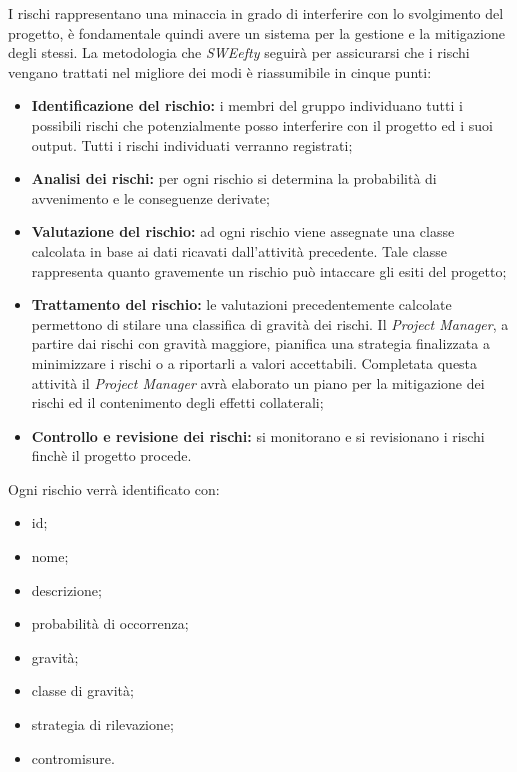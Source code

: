 I rischi rappresentano una minaccia in grado di interferire con lo svolgimento del progetto, è fondamentale quindi avere un sistema per la gestione e la mitigazione degli stessi.
La metodologia che \textit{SWEefty} seguirà per assicurarsi che i rischi vengano trattati nel migliore dei modi è riassumibile in cinque punti:
\begin{itemize}
	\item \textbf{Identificazione del rischio:} i membri del gruppo individuano tutti i possibili rischi che potenzialmente posso interferire con il progetto ed i suoi output. Tutti i rischi individuati verranno registrati;
	
	\item \textbf{Analisi dei rischi:} per ogni rischio si determina la probabilità di avvenimento e le conseguenze derivate;
	
	\item \textbf{Valutazione del rischio:} ad ogni rischio viene assegnate una classe calcolata in base ai dati ricavati dall'attività precedente. Tale classe rappresenta quanto gravemente un rischio può intaccare gli esiti del progetto;
	
	\item \textbf{Trattamento del rischio:} le valutazioni precedentemente calcolate permettono di stilare una classifica di gravità dei rischi. Il \emph{Project Manager}, a partire dai rischi con gravità maggiore, pianifica una strategia finalizzata a minimizzare i rischi o a riportarli a valori accettabili. Completata questa attività il \emph{Project Manager} avrà elaborato un piano per la mitigazione dei rischi ed il contenimento degli effetti collaterali;
	
	\item \textbf{Controllo e revisione dei rischi:} si monitorano e si revisionano i rischi finchè il progetto procede.
\end{itemize}

Ogni rischio verrà identificato con:
\begin{itemize}
	\item id;
	\item nome;
	\item descrizione;
	\item probabilità di occorrenza;
	\item gravità;
	\item classe di gravità;
	\item strategia di rilevazione;
	\item contromisure.
\end{itemize}

